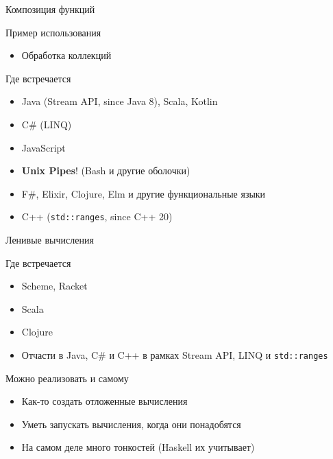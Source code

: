 \documentclass{beamer}
\begin{document}
\begin{frame}{Композиция функций}
    \begin{block}{Пример использования}
        \begin{itemize}
            \item Обработка коллекций
        \end{itemize}
    \end{block}
    \begin{block}{Где встречается}
        \begin{itemize}
            \item Java (Stream API, since Java 8), Scala, Kotlin
            \item C\# (LINQ)
            \item JavaScript
            \item \textbf{Unix Pipes}! (Bash и другие оболочки)
            \item F\#, Elixir, Clojure, Elm и другие функциональные языки
            \item C++ (\texttt{std::ranges}, since C++ 20)
        \end{itemize}
    \end{block}
\end{frame}
\begin{frame}{Ленивые вычисления}
    \begin{block}{Где встречается}
        \begin{itemize}
            \item Scheme, Racket
            \item Scala
            \item Clojure
            \item Отчасти в Java, C\# и C++ в рамках Stream API, LINQ и \texttt{std::ranges}
        \end{itemize}
    \end{block}
    \begin{block}{Можно реализовать и самому}
        \begin{itemize}
            \item Как-то создать отложенные вычисления
            \item Уметь запускать вычисления, когда они понадобятся
            \item На самом деле много тонкостей (Haskell их учитывает)
        \end{itemize}
    \end{block}
\end{frame}
\end{document}
